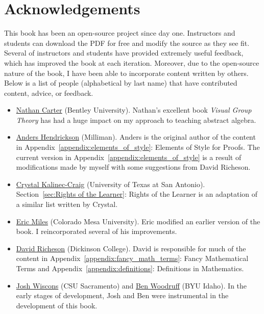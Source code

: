 \chapter*{Acknowledgements}

\noindent This book has been an open-source project since day one. Instructors and students can download the PDF for free and modify the source as they see fit. Several of instructors and students have provided extremely useful feedback, which has improved the book at each iteration. Moreover, due to the open-source nature of the book, I have been able to incorporate content written by others. Below is a list of people (alphabetical by last name) that have contributed content, advice, or feedback.

\begin{itemize}
\item \href{https://faculty.bentley.edu/details.asp?uname=ncarter}{Nathan Carter} (Bentley University). Nathan's excellent book \emph{Visual Group Theory} has had a huge impact on my approach to teaching abstract algebra.
\item \href{https://www.linkedin.com/in/andershendrickson/}{Anders Hendrickson} (Milliman). Anders is the original author of the content in Appendix~\ref{appendix:elements_of_style}: Elements of Style for Proofs. The current version in Appendix~\ref{appendix:elements_of_style} is a result of modifications made by myself with some suggestions from David Richeson.
\item \href{https://embracinglifewithmajorrevisions.org/2017/07/12/rights-of-the-learner-an-introduction/}{Crystal Kalinec-Craig} (University of Texas at San Antonio). Section~\ref{sec:Rights of the Learner}: Rights of the Learner is an adaptation of a similar list written by Crystal.
\item \href{https://ericwmiles.weebly.com}{Eric Miles} (Colorado Mesa University). Eric modified an earlier version of the book. I reincorporated several of his improvements.
\item \href{http://users.dickinson.edu/~richesod/}{David Richeson} (Dickinson College). David is responsible for much of the content in Appendix~\ref{appendix:fancy_math_terms}: Fancy Mathematical Terms and Appendix~\ref{appendix:definitions}: Definitions in Mathematics.
\item \href{http://webpages.csus.edu/wiscons/}{Josh Wiscons} (CSU Sacramento) and \href{http://emp.byui.edu/woodruffb/}{Ben Woodruff} (BYU Idaho). In the early stages of development, Josh and Ben were instrumental in the development of this book.
\end{itemize}
